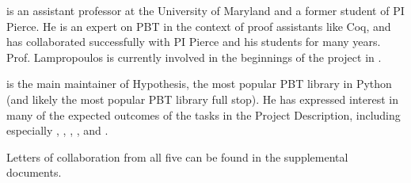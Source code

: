 \smallskip{} is an assistant professor at the
University of Maryland and a former student of PI Pierce.  He is an expert on
PBT in the context of proof assistants like Coq, and has collaborated
successfully with PI Pierce and his students for many years. Prof. Lampropoulos
is currently involved in the beginnings of the project in
.

\smallskip{} is the main maintainer of
Hypothesis, the most popular PBT library in Python (and likely the
most popular PBT library full stop). He has expressed interest in many
of the expected outcomes of the tasks in the Project Description,
including especially ,
, ,
, and .

\bigskip

\noindent Letters of collaboration from all five can be found in the supplemental
documents.
